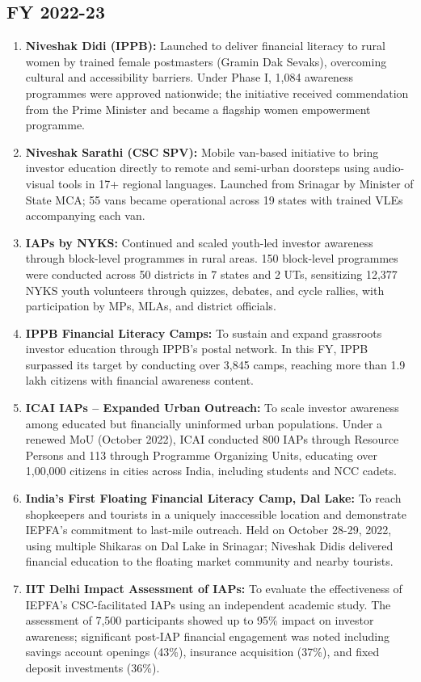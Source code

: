 \documentclass[openany]{book}
\begin{document}
\subsection{FY 2022-23}
\begin{enumerate}
    \item \textbf{Niveshak Didi (IPPB):} Launched to deliver financial literacy to rural women by trained female postmasters (Gramin Dak Sevaks), overcoming cultural and accessibility barriers. Under Phase I, 1,084 awareness programmes were approved nationwide; the initiative received commendation from the Prime Minister and became a flagship women empowerment programme.
    \item \textbf{Niveshak Sarathi (CSC SPV):} Mobile van-based initiative to bring investor education directly to remote and semi-urban doorsteps using audio-visual tools in 17+ regional languages. Launched from Srinagar by Minister of State MCA; 55 vans became operational across 19 states with trained VLEs accompanying each van.
    \item \textbf{IAPs by NYKS:} Continued and scaled youth-led investor awareness through block-level programmes in rural areas. 150 block-level programmes were conducted across 50 districts in 7 states and 2 UTs, sensitizing 12,377 NYKS youth volunteers through quizzes, debates, and cycle rallies, with participation by MPs, MLAs, and district officials.
    \item \textbf{IPPB Financial Literacy Camps:} To sustain and expand grassroots investor education through IPPB's postal network. In this FY, IPPB surpassed its target by conducting over 3,845 camps, reaching more than 1.9 lakh citizens with financial awareness content.
    \item \textbf{ICAI IAPs – Expanded Urban Outreach:} To scale investor awareness among educated but financially uninformed urban populations. Under a renewed MoU (October 2022), ICAI conducted 800 IAPs through Resource Persons and 113 through Programme Organizing Units, educating over 1,00,000 citizens in cities across India, including students and NCC cadets.
    \item \textbf{India's First Floating Financial Literacy Camp, Dal Lake:} To reach shopkeepers and tourists in a uniquely inaccessible location and demonstrate IEPFA's commitment to last-mile outreach. Held on October 28-29, 2022, using multiple Shikaras on Dal Lake in Srinagar; Niveshak Didis delivered financial education to the floating market community and nearby tourists.
    \item \textbf{IIT Delhi Impact Assessment of IAPs:} To evaluate the effectiveness of IEPFA's CSC-facilitated IAPs using an independent academic study. The assessment of 7,500 participants showed up to 95\% impact on investor awareness; significant post-IAP financial engagement was noted including savings account openings (43\%), insurance acquisition (37\%), and fixed deposit investments (36\%).

\end{enumerate}
\end{document}
